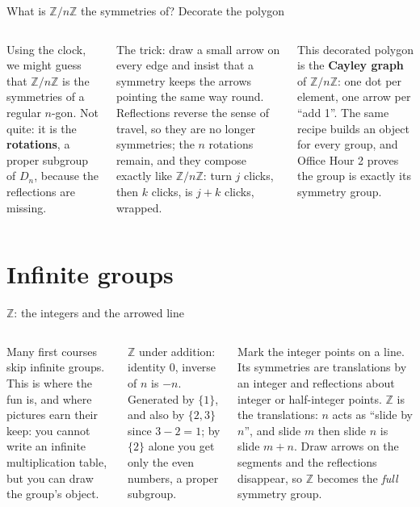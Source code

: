 \documentclass[aspectratio=169,10pt]{beamer}
\newcommand{\Z}{\mathbb{Z}}
\begin{document}
\begin{frame}{What is $\Z/n\Z$ the symmetries of? Decorate the polygon}
\begin{columns}[T]
\centering\scalebox{0.9}{\figarrowgon}
Using the clock, we might guess that $\Z/n\Z$ is the symmetries of a regular $n$-gon. Not quite: it is the \textbf{rotations}, a proper subgroup of $D_n$, because the reflections are missing.
\vspace{3pt}

The trick: draw a small arrow on every edge and insist that a symmetry keeps the arrows pointing the same way round. Reflections reverse the sense of travel, so they are no longer symmetries; the $n$ rotations remain, and they compose exactly like $\Z/n\Z$: turn $j$ clicks, then $k$ clicks, is $j+k$ clicks, wrapped.
\begin{bigbox}
This decorated polygon is the \textbf{Cayley graph} of $\Z/n\Z$: one dot per element, one arrow per ``add 1''. The same recipe builds an object for every group, and Office Hour 2 proves the group is exactly its symmetry group.
\end{bigbox}
\end{columns}
\end{frame}

\section{Infinite groups}

\begin{frame}{$\Z$: the integers and the arrowed line}
\begin{columns}[T]
\centering\scalebox{0.95}{\figline}
Many first courses skip infinite groups. This is where the fun is, and where pictures earn their keep: you cannot write an infinite multiplication table, but you can draw the group's object.
\vspace{3pt}

$\Z$ under addition: identity $0$, inverse of $n$ is $-n$. Generated by $\{1\}$, and also by $\{2,3\}$ since $3-2=1$; by $\{2\}$ alone you get only the even numbers, a proper subgroup.
\vspace{3pt}

Mark the integer points on a line. Its symmetries are translations by an integer and reflections about integer or half-integer points. $\Z$ is the translations: $n$ acts as ``slide by $n$'', and slide $m$ then slide $n$ is slide $m+n$. Draw arrows on the segments and the reflections disappear, so $\Z$ becomes the \emph{full} symmetry group.
\end{columns}
\end{frame}
\end{document}
